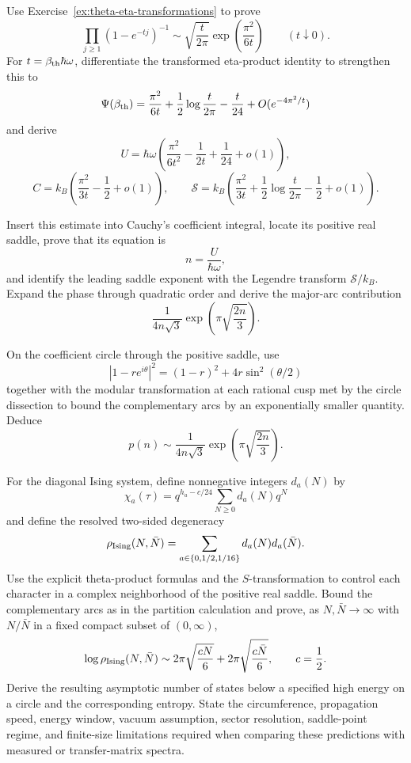 \begin{exercise}
Use Exercise~\ref{ex:theta-eta-transformations} to prove
\[
\prod_{j\geq1}(1-e^{-tj})^{-1}
\sim\sqrt{\frac{t}{2\pi}}
\exp\!\left(\frac{\pi^2}{6t}\right)
\qquad(t\downarrow0).
\]
For $t=\beta_{\rm th}\hbar\omega$, differentiate the transformed
eta-product identity
to strengthen this to
\[
\Psi(\beta_{\rm th})
=\frac{\pi^2}{6t}+\frac12\log\frac{t}{2\pi}
-\frac{t}{24}+O(e^{-4\pi^2/t})
\]
and derive
\[
U=\hbar\omega\left(
\frac{\pi^2}{6t^2}-\frac1{2t}+\frac1{24}+o(1)\right),
\]
\[
C=k_B\left(\frac{\pi^2}{3t}-\frac12+o(1)\right),
\qquad
\mathcal S=k_B\left(
\frac{\pi^2}{3t}+\frac12\log\frac{t}{2\pi}-\frac12+o(1)\right).
\]
\end{exercise}

\begin{exercise}
Insert this estimate into Cauchy's coefficient integral, locate its positive
real saddle, prove that its equation is
\[
n=\frac{U}{\hbar\omega},
\]
and identify the leading saddle exponent with the Legendre transform
$\mathcal S/k_B$.  Expand the phase through quadratic order and derive the
major-arc contribution
\[
\frac1{4n\sqrt3}
\exp\!\left(\pi\sqrt{\frac{2n}{3}}\right).
\]
\end{exercise}

\begin{exercise}
On the coefficient circle through the positive saddle, use
\[
|1-re^{i\theta}|^2=(1-r)^2+4r\sin^2(\theta/2)
\]
together with the modular transformation at each rational cusp met by the
circle dissection to bound the complementary arcs by an exponentially smaller
quantity.  Deduce
\[
p(n)\sim\frac1{4n\sqrt3}
\exp\!\left(\pi\sqrt{\frac{2n}{3}}\right).
\]
\end{exercise}

\begin{exercise}
For the diagonal Ising system, define nonnegative integers $d_a(N)$ by
\[
\chi_a(\tau)
=q^{h_a-c/24}\sum_{N\geq0}d_a(N)q^N
\]
and define the resolved two-sided degeneracy
\[
\rho_{\rm Ising}(N,\bar N)
=\sum_{a\in\{0,1/2,1/16\}}d_a(N)d_a(\bar N).
\]
Use the explicit theta-product formulas and the $S$-transformation to
control each character in a complex neighborhood of the positive real
saddle.  Bound the complementary arcs as in the partition calculation and
prove, as $N,\bar N\to\infty$ with $N/\bar N$ in a fixed compact subset of
$(0,\infty)$,
\[
\log\rho_{\rm Ising}(N,\bar N)
\sim2\pi\sqrt{\frac{cN}{6}}
+2\pi\sqrt{\frac{c\bar N}{6}},
\qquad c=\frac12.
\]
Derive the resulting asymptotic number of states below a specified high
energy on a circle and the corresponding entropy.  State
the circumference, propagation speed, energy window, vacuum assumption,
sector resolution, saddle-point regime, and finite-size limitations required
when comparing these predictions with measured or transfer-matrix spectra.
\end{exercise}

